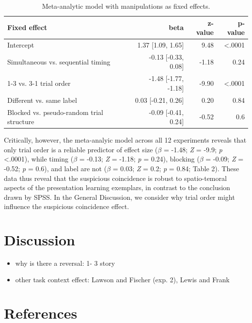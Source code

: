 \documentclass[english,floatsintext,man]{apa6}
\providecommand{\tightlist}{%
  \setlength{\itemsep}{0pt}\setlength{\parskip}{0pt}}
\theoremstyle{definition}
\theoremstyle{definition}
\theoremstyle{remark}
\begin{document}
\begin{table}

\caption{\label{tab:unnamed-chunk-5}Meta-analytic model with manipulations as fixed effects.}
\centering
\fontsize{12}{14}\selectfont
\begin{tabular}[t]{lrrr}
\toprule
Fixed effect & beta & z-value & p-value\\
\midrule
Intercept & 1.37 [1.09, 1.65] & 9.48 & <.0001\\
Simultaneous vs. sequential timing & -0.13 [-0.33, 0.08] & -1.18 & 0.24\\
1-3 vs. 3-1 trial order & -1.48 [-1.77, -1.18] & -9.90 & <.0001\\
Different vs. same label & 0.03 [-0.21, 0.26] & 0.20 & 0.84\\
Blocked vs. pseudo-random trial structure & -0.09 [-0.41, 0.24] & -0.52 & 0.6\\
\bottomrule
\end{tabular}
\end{table}

Critically, however, the meta-analyic model across all 12 experiments
reveals that only trial order is a reliable predictor of effect size
(\(\beta\) = -1.48; \emph{Z} = -9.9; \emph{p} \textless{}.0001), while
timing (\(\beta\) = -0.13; \emph{Z} = -1.18; \emph{p} = 0.24), blocking
(\(\beta\) = -0.09; \emph{Z} = -0.52; \emph{p} = 0.6), and label are not
(\(\beta\) = 0.03; \emph{Z} = 0.2; \emph{p} = 0.84; Table 2). These data
thus reveal that the suspicious coincidence is robust to spatio-temoral
aspects of the presentation learning exemplars, in contrast to the
conclusion drawn by SPSS. In the General Discussion, we consider why
trial order might influence the suspicious coincidence effect.

\section{Discussion}\label{discussion}

\begin{itemize}
\tightlist
\item
  why is there a reversal: 1- 3 story
\item
  other task context effect: Lawson and Fischer (exp. 2), Lewis and
  Frank
\end{itemize}

\newpage

\section{References}\label{references}
\end{document}
